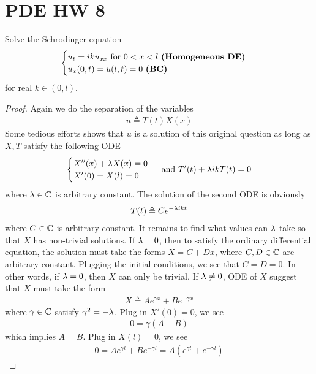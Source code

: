 \documentclass{report}
\begin{document}
\section{PDE HW 8}
\begin{question}{}{}
Solve the Schrodinger equation 
\begin{align*}
\begin{cases}
  u_t=iku_{xx}\text{ for }0<x<l\text{ \textbf{(Homogeneous DE)} } \\
  u_x(0,t)=u(l,t)=0\text{ \textbf{(BC)} }
\end{cases}
\end{align*}
for real $k \in (0,l)$. 
\end{question}
\begin{proof}
Again we do the separation of the variables 
\begin{align*}
u\triangleq T(t)X(x)
\end{align*}
Some tedious efforts shows that $u$ is a solution of this original question as long as $X,T$ satisfy the following ODE 
\begin{align*}
\begin{cases}
  X''(x)+\lambda  X(x)=0\\
  X'(0)=X(l)=0
\end{cases}\text{ and }T'(t)+\lambda  ik T(t)=0
\end{align*}
where $\lambda \in\mathbb{C}$ is arbitrary constant. The solution of the second ODE is obviously 
\begin{align*}
T(t)\triangleq Ce^{-\lambda  ik t}
\end{align*}
where $C\in\mathbb{C}$ is arbitrary constant. It remains to find what values can $\lambda $ take so that $X$ has non-trivial solutions.  If $\lambda =0$, then to satisfy the ordinary differential equation, the solution must take the forms $X=C+Dx$, where $C,D\in\mathbb{C}$ are arbitrary constant. Plugging the initial conditions, we see that $C=D=0$. In other words, if  $\lambda =0$, then $X$ can only be trivial. If $\lambda \neq 0$, ODE of $X$ suggest that  $X$ must take the form
\begin{align*}
X\triangleq Ae^{\gamma x}+Be^{-\gamma x}
\end{align*}
where $\gamma \in\mathbb{C}$ satisfy $\gamma ^2=-\lambda $. Plug in $X'(0)=0$, we see 
\begin{align*}
0=\gamma (A-B)
\end{align*}
which implies $A=B$. Plug in $X(l)=0$, we see 
\begin{align*}
0=A e^{\gamma  l}+B e^{- \gamma l}=A(e^{\gamma l}+e^{-\gamma l})
\end{align*}

\end{proof}
\end{document}
